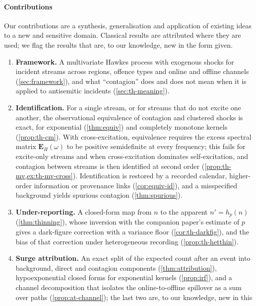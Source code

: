 \paragraph{Contributions}
Our contributions are a synthesis, generalisation and application of
existing ideas to a new and sensitive domain. Classical results are
attributed where they are used; we flag the results that are, to our
knowledge, new in the form given.
\begin{enumerate}[label=\textbf{C\arabic*},ref=C\arabic*,leftmargin=2.4em,itemsep=2pt]
  \item\label{contrib:framework} \textbf{Framework.} A multivariate Hawkes
  process with exogenous shocks for incident streams across regions, offence
  types and online and offline channels (\cref{sec:framework}), and what
  ``contagion'' does and does not mean when it is applied to antisemitic
  incidents (\cref{sec:th-meaning}).
  \item\label{contrib:id} \textbf{Identification.} For a single stream, or
  for streams that do not excite one another, the observational equivalence of
  contagion and clustered shocks is exact, for exponential
  (\cref{thm:equiv}) and completely monotone kernels (\cref{prop:th-cm}). With
  cross-excitation, equivalence requires the excess spectral matrix
  $\bm E_H(\omega)$ to be positive semidefinite at every frequency; this fails
  for excite-only streams and when cross-excitation dominates self-excitation,
  and contagion between streams is then identified at second order
  (\cref{prop:th-mv,ex:th-mv-cross}). Identification is restored by a recorded
  calendar, higher-order information or provenance links
  (\cref{cor:equiv-id}), and a misspecified background yields spurious
  contagion (\cref{thm:spurious}).
  \item\label{contrib:thin} \textbf{Under-reporting.} A closed-form map from
  $n$ to the apparent $n'=h_p(n)$ (\cref{thm:thinning}), whose inversion with
  the companion paper's estimate of $p$ gives a dark-figure correction with a
  variance floor (\cref{cor:th-darkfig}), and the bias of that correction
  under heterogeneous recording (\cref{prop:th-hetthin}).
  \item\label{contrib:attr} \textbf{Surge attribution.} An exact split of the
  expected count after an event into background, direct and contagion
  components (\cref{thm:attribution}), hypoexponential closed forms for
  exponential kernels (\cref{prop:irf}), and a channel decomposition that
  isolates the online-to-offline spillover as a sum over paths
  (\cref{prop:at-channel}); the last two are, to our knowledge, new in this

\end{enumerate}
